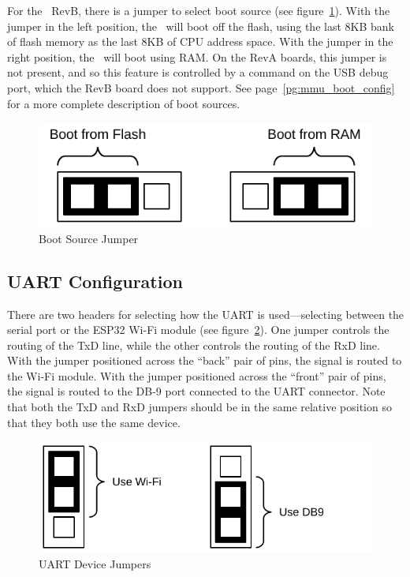For the \jr\ RevB, there is a jumper to select boot source (see figure~\ref{fig:jmp_boot}). With the jumper in the left position, the \jr\ will boot off the flash, using the last 8KB bank of flash memory as the last 8KB of CPU address space. With the jumper in the right position, the \jr\ will boot using RAM. On the RevA boards, this jumper is not present, and so this feature is controlled by a command on the USB debug port, which the RevB board does not support. See page~\ref{pg:mmu_boot_config} for a more complete description of boot sources.

\begin{figure}[ht]
    \begin{center}
        \includegraphics[scale=0.65]{images/jumper_boot.pdf}
    \end{center}
    \caption{Boot Source Jumper}
    \label{fig:jmp_boot}
\end{figure}

\subsection*{UART Configuration}

There are two headers for selecting how the UART is used---selecting between the serial port or the ESP32 Wi-Fi module (see figure~\ref{fig:jmp_uart}). One jumper controls the routing of the TxD line, while the other controls the routing of the RxD line. With the jumper positioned across the ``back'' pair of pins, the signal is routed to the Wi-Fi module. With the jumper positioned across the ``front'' pair of pins, the signal is routed to the DB-9 port connected to the UART connector. Note that both the TxD and RxD jumpers should be in the same relative position so that they both use the same device.

\begin{figure}[ht]
    \begin{center}
        \includegraphics[scale=0.65]{images/jumper_uart.pdf}
    \end{center}
    \caption{UART Device Jumpers}
    \label{fig:jmp_uart}
\end{figure}